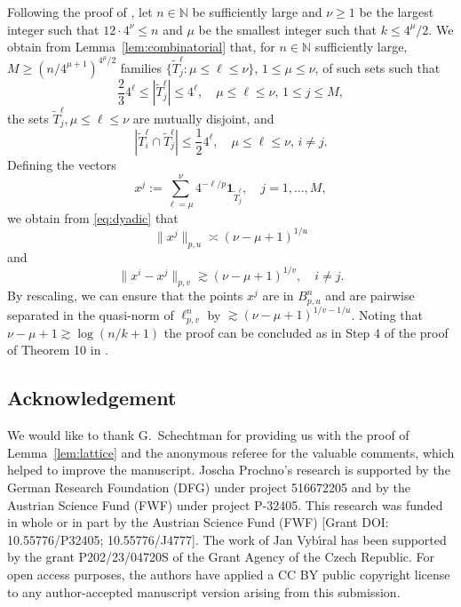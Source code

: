 \documentclass[a4paper,12pt]{article}
\theoremstyle{definition}
\newcommand{\N}{\mathbb{N}}
\begin{document}
Following the proof of \cite[Theorem 10]{DV20}, let $n\in\N$ be sufficiently large and $\nu\ge 1$ be the largest integer such that $12\cdot 4^{\nu}\le n$ and $\mu$ be the smallest integer such that $k\le 4^{\mu}/2$. We obtain from Lemma~\ref{lem:combinatorial} that, for $n\in\N$ sufficiently large, $M\ge (n/4^{\mu+1})^{4^{\mu}/2}$ families $\{\widetilde{T}_j^{\ell}\colon \mu\le \ell\le \nu\}$, $1\le \mu\le \nu$, of such sets such that
\[
\frac{2}{3}4^{\ell}\le |\widetilde{T}_j^{\ell}|\le 4^{\ell},\quad \mu\le \ell \le \nu,\, 1\le j\le M,
\]
the sets $\widetilde{T}_j^{\ell}, \mu\le \ell\le \nu$ are mutually disjoint, and 
\[
|\widetilde{T}_i^{\ell}\cap \widetilde{T}_j^{\ell}|\le \frac{1}{2}4^{\ell},\quad \mu\le \ell \le \nu,\, i\neq j.
\]
Defining the vectors 
\[
x^j := \sum_{\ell=\mu}^{\nu}4^{-\ell/p}\mathbf{1}_{\widetilde{T}_j^{\ell}},\quad j=1,\dots,M,
\]
we obtain from \eqref{eq:dyadic} that
\[
\|x^j\|_{p,u}\asymp (\nu-\mu+1)^{1/u}
\]
and 
\[
\|x^i-x^j\|_{p,v}\gtrsim (\nu-\mu+1)^{1/v},\quad i\neq j.
\]
By rescaling, we can ensure that the points $x^j$ are in $B_{p,u}^n$ and are pairwise separated in the quasi-norm of $\ell_{p,v}^n$ by $\gtrsim (\nu-\mu+1)^{1/v-1/u}$. Noting that $\nu-\mu+1\gtrsim \log(n/k+1)$ the proof can be concluded as in Step 4 of the proof of Theorem 10 in \cite{DV20}. 

\subsection*{Acknowledgement}
We would like to thank G.~Schechtman for providing us with the proof of Lemma~\ref{lem:lattice} and the anonymous referee for the valuable comments, which helped to improve the manuscript.
Joscha Prochno’s research is supported by the German Research Foundation (DFG) under project 516672205 and by the Austrian Science Fund (FWF) under project P-32405.
This research was funded in whole or in part by the Austrian Science Fund (FWF) [Grant DOI: 10.55776/P32405; 10.55776/J4777].
The work of Jan Vyb\'\i ral has been supported by the grant P202/23/04720S of the Grant Agency of the Czech Republic.
For open access purposes, the authors have applied a CC BY public copyright license to any author-accepted manuscript version arising from this submission.




\end{document}
